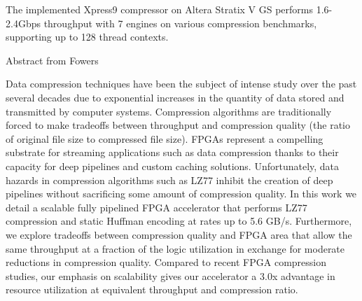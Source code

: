 The implemented Xpress9 compressor on Altera Stratix V GS performs 1.6-2.4Gbps
throughput with 7 engines on various compression benchmarks, 
supporting up to 128 thread contexts.

Abstract from Fowers\cite{17}

Data compression techniques have been the subject of intense study
over the past several decades due to exponential increases in the
quantity of data stored and transmitted by computer
systems. Compression algorithms are traditionally forced to make
tradeoffs between throughput and compression quality (the ratio of
original file size to compressed file size). FPGAs represent a
compelling substrate for streaming applications such as data
compression thanks to their capacity for deep pipelines and custom
caching solutions. Unfortunately, data hazards in compression
algorithms such as LZ77 inhibit the creation of deep pipelines
without sacrificing some amount of compression quality. In this work
we detail a scalable fully pipelined FPGA accelerator that performs
LZ77 compression and static Huffman encoding at rates up to 5.6
GB/s. Furthermore, we explore tradeoffs between compression quality
and FPGA area that allow the same throughput at a fraction of the
logic utilization in exchange for moderate reductions in compression
quality. Compared to recent FPGA compression studies, our emphasis on
scalability gives our accelerator a 3.0x advantage in resource
utilization at equivalent throughput and compression ratio.

